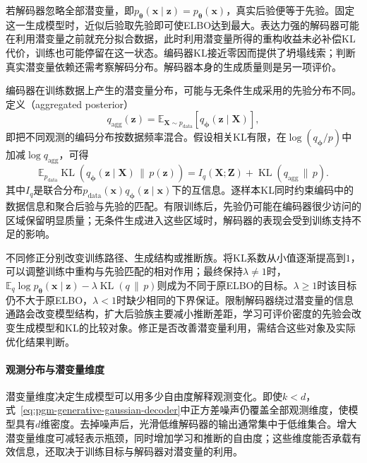 若解码器忽略全部潜变量，即$p_{\bm{\theta}}(\bm{x}\mid\bm{z})=p_{\bm{\theta}}(\bm{x})$，真实后验便等于先验。固定这一生成模型时，近似后验取先验即可使ELBO达到最大。表达力强的解码器可能在利用潜变量之前就充分拟合数据，此时利用潜变量所得的重构收益未必补偿KL代价，训练也可能停留在这一状态。编码器KL接近零因而提供了坍塌线索；判断真实潜变量依赖还需考察解码分布。解码器本身的生成质量则是另一项评价。

编码器在训练数据上产生的潜变量分布，可能与无条件生成采用的先验分布不同。定义（aggregated posterior）
\begin{equation}
  \label{eq:pgm-generative-aggregated-posterior}
  q_{\mathrm{agg}}(\bm{z})
  =\mathbb{E}_{\bm{X}\sim p_{\mathrm{data}}}
       [q_{\bm{\phi}}(\bm{z}\mid\bm{X})],
\end{equation}
即把不同观测的编码分布按数据频率混合。假设相关KL有限，在$\log(q_{\bm{\phi}}/p)$中加减$\log q_{\mathrm{agg}}$，可得
\begin{equation}
  \label{eq:pgm-generative-kl-information}
  \mathbb{E}_{p_{\mathrm{data}}}
    \operatorname{KL}(q_{\bm{\phi}}(\bm{z}\mid\bm{X})\,\|\,p(\bm{z}))
  =I_q(\bm{X};\bm{Z})+
    \operatorname{KL}(q_{\mathrm{agg}}\,\|\,p).
\end{equation}
其中$I_q$是联合分布$p_{\mathrm{data}}(\bm{x})q_{\bm{\phi}}(\bm{z}\mid\bm{x})$下的互信息。逐样本KL同时约束编码中的数据信息和聚合后验与先验的匹配。有限训练后，先验仍可能在编码器很少访问的区域保留明显质量；无条件生成进入这些区域时，解码器的表现会受到训练支持不足的影响。

不同修正分别改变训练路径、生成结构或推断族。将KL系数从小值逐渐提高到$1$，可以调整训练中重构与先验匹配的相对作用；最终保持$\lambda\ne1$时，$\mathbb{E}_q\log p_{\bm{\theta}}(\bm{x}\mid\bm{z})-\lambda \operatorname{KL}(q\,\|\,p)$则成为不同于原ELBO的目标。$\lambda\geq1$时该目标仍不大于原ELBO，$\lambda<1$时缺少相同的下界保证。限制解码器绕过潜变量的信息通路会改变模型结构，扩大后验族主要减小推断差距，学习可评价密度的先验会改变生成模型和KL的比较对象。修正是否改善潜变量利用，需结合这些对象及实际优化结果判断。

\label{sec:pgm-generative-vae-expression}

\paragraph{观测分布与潜变量维度}

潜变量维度决定生成模型可以用多少自由度解释观测变化。即使$k<d$，式~\eqref{eq:pgm-generative-gaussian-decoder}中正方差噪声仍覆盖全部观测维度，使模型具有$d$维密度。去掉噪声后，光滑低维解码器的输出通常集中于低维集合。增大潜变量维度可减轻表示瓶颈，同时增加学习和推断的自由度；这些维度能否承载有效信息，还取决于训练目标与解码器对潜变量的利用。

